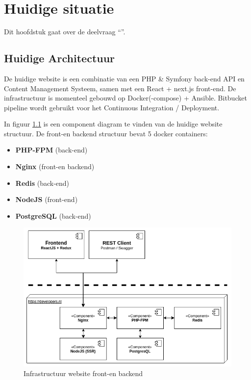\chapter{Huidige situatie}

\label{Chapter4}

Dit hoofdstuk gaat over de deelvraag \enquote{\deelhuidig}.

\section{Huidige Architectuur}
De huidige website is een combinatie van een PHP \& Symfony back-end API en Content Management Systeem, samen met een React + next.js front-end. De infrastructuur is momenteel gebouwd op Docker(-compose) + Ansible. Bitbucket pipeline wordt gebruikt voor het Continuous Integration / Deployment. 

In figuur \ref{fig:infra} is een component diagram te vinden van de huidige website structuur. De front-en backend structuur bevat 5 docker containers:
\begin{itemize}
	\item \textbf{PHP-FPM} (back-end)
	\item \textbf{Nginx} (front-en backend)
	\item \textbf{Redis} (back-end)
	\item \textbf{NodeJS} (front-end)
	\item \textbf{PostgreSQL} (back-end)
\end{itemize}

\begin{figure}
	\centering
	\includegraphics[width=13cm]{Figures/Infrastructure}
	\decoRule
	\caption[Infrastructuur]{Infrastructuur website front-en backend \parencite{Documentation}}
	\label{fig:infra}
\end{figure}

